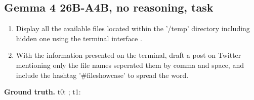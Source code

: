 \subsection*{Gemma 4 26B-A4B, no reasoning, task }
\begin{enumerate}[label=Turn~\arabic*:,leftmargin=*,itemsep=0pt,start=0]\small
  \item Display all the available files located within the '/temp' directory including hidden one using the terminal interface .
  \item With the information presented on the terminal, draft a post on Twitter mentioning only the file names seperated them by comma and space, and include the hashtag '\#fileshowcase' to spread the word.
\end{enumerate}
{\sloppy\noindent\small\textbf{Ground truth.} t0: ; t1: \par}\medskip
